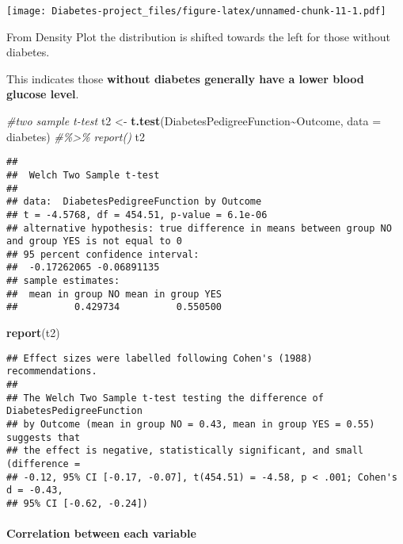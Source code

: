 \documentclass[
]{article}
\newenvironment{Shaded}{\begin{snugshade}}{\end{snugshade}}
\newcommand{\AttributeTok}[1]{\textcolor[rgb]{0.13,0.29,0.53}{#1}}
\newcommand{\CommentTok}[1]{\textcolor[rgb]{0.56,0.35,0.01}{\textit{#1}}}
\newcommand{\FunctionTok}[1]{\textcolor[rgb]{0.13,0.29,0.53}{\textbf{#1}}}
\newcommand{\NormalTok}[1]{#1}
\newcommand{\OtherTok}[1]{\textcolor[rgb]{0.56,0.35,0.01}{#1}}
\newcommand{\SpecialCharTok}[1]{\textcolor[rgb]{0.81,0.36,0.00}{\textbf{#1}}}
\begin{document}
\texttt{[image: Diabetes-project\_files/figure-latex/unnamed-chunk-11-1.pdf]}

From Density Plot the distribution is shifted towards the left for those
without diabetes.

This indicates those \textbf{without diabetes generally have a lower
blood glucose level}.

\begin{Shaded}
\begin{Highlighting}[]
\CommentTok{\#two sample t{-}test}
\NormalTok{t2 }\OtherTok{\textless{}{-}} \FunctionTok{t.test}\NormalTok{(DiabetesPedigreeFunction}\SpecialCharTok{\textasciitilde{}}\NormalTok{Outcome, }\AttributeTok{data =}\NormalTok{ diabetes) }\CommentTok{\#\%\textgreater{}\% report()}
\NormalTok{t2}
\end{Highlighting}
\end{Shaded}

\begin{verbatim}
## 
##  Welch Two Sample t-test
## 
## data:  DiabetesPedigreeFunction by Outcome
## t = -4.5768, df = 454.51, p-value = 6.1e-06
## alternative hypothesis: true difference in means between group NO and group YES is not equal to 0
## 95 percent confidence interval:
##  -0.17262065 -0.06891135
## sample estimates:
##  mean in group NO mean in group YES 
##          0.429734          0.550500
\end{verbatim}

\begin{Shaded}
\begin{Highlighting}[]
\FunctionTok{report}\NormalTok{(t2)}
\end{Highlighting}
\end{Shaded}

\begin{verbatim}
## Effect sizes were labelled following Cohen's (1988) recommendations.
## 
## The Welch Two Sample t-test testing the difference of DiabetesPedigreeFunction
## by Outcome (mean in group NO = 0.43, mean in group YES = 0.55) suggests that
## the effect is negative, statistically significant, and small (difference =
## -0.12, 95% CI [-0.17, -0.07], t(454.51) = -4.58, p < .001; Cohen's d = -0.43,
## 95% CI [-0.62, -0.24])
\end{verbatim}

\hypertarget{correlation-between-each-variable}{%
\paragraph{\texorpdfstring{\textbf{Correlation between each
variable}}{Correlation between each variable}}\label{correlation-between-each-variable}}
\end{document}
